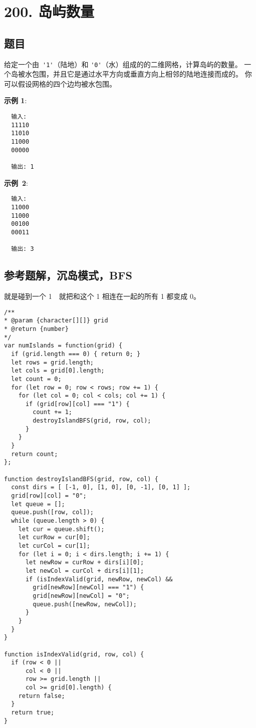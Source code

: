 \newpage
\section{200. 岛屿数量}
\label{leetcode:200}

\subsection{题目}

给定一个由 \verb|'1'|（陆地）和 \verb|'0'|（水）组成的的二维网格，计算岛屿的数量。
一个岛被水包围，并且它是通过水平方向或垂直方向上相邻的陆地连接而成的。
你可以假设网格的四个边均被水包围。

\textbf{示例 1}:

\begin{verbatim}
  输入:
  11110
  11010
  11000
  00000

  输出: 1
\end{verbatim}

\textbf{示例 2}:

\begin{verbatim}
  输入:
  11000
  11000
  00100
  00011

  输出: 3
\end{verbatim}

\subsection{参考题解，沉岛模式，BFS}

就是碰到一个 1　就把和这个 1 相连在一起的所有 1 都变成 0。

\begin{verbatim}
/**
* @param {character[][]} grid
* @return {number}
*/
var numIslands = function(grid) {
  if (grid.length === 0) { return 0; }
  let rows = grid.length;
  let cols = grid[0].length;
  let count = 0;
  for (let row = 0; row < rows; row += 1) {
    for (let col = 0; col < cols; col += 1) {
      if (grid[row][col] === "1") {
        count += 1;
        destroyIslandBFS(grid, row, col);
      }
    }
  }
  return count;
};

function destroyIslandBFS(grid, row, col) {
  const dirs = [ [-1, 0], [1, 0], [0, -1], [0, 1] ];
  grid[row][col] = "0";
  let queue = [];
  queue.push([row, col]);
  while (queue.length > 0) {
    let cur = queue.shift();
    let curRow = cur[0];
    let curCol = cur[1];
    for (let i = 0; i < dirs.length; i += 1) {
      let newRow = curRow + dirs[i][0];
      let newCol = curCol + dirs[i][1];
      if (isIndexValid(grid, newRow, newCol) &&
        grid[newRow][newCol] === "1") {
        grid[newRow][newCol] = "0";
        queue.push([newRow, newCol]);
      }
    }
  }
}

function isIndexValid(grid, row, col) {
  if (row < 0 ||
      col < 0 ||
      row >= grid.length ||
      col >= grid[0].length) {
    return false;
  }
  return true;
}
\end{verbatim}

